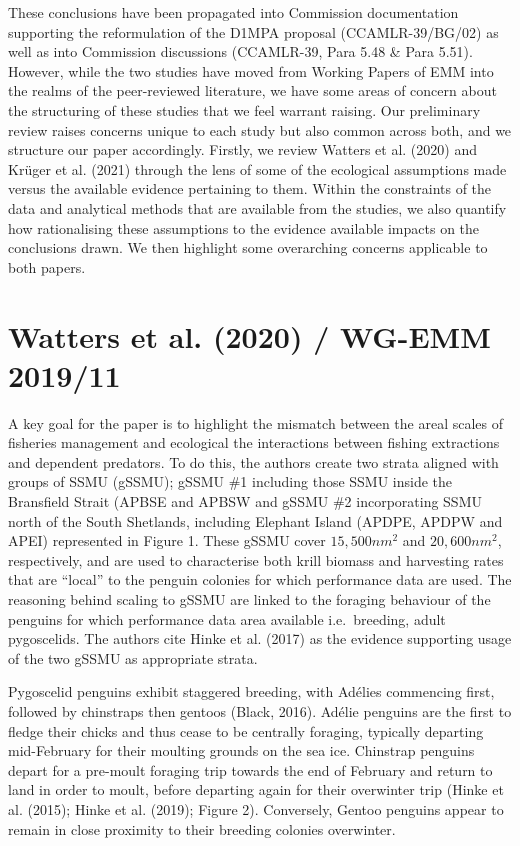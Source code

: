 \documentclass[]{elsarticle} %
\begin{document}
These conclusions have been propagated into Commission documentation
supporting the reformulation of the D1MPA proposal (CCAMLR-39/BG/02) as
well as into Commission discussions (CCAMLR-39, Para 5.48 \& Para 5.51).
However, while the two studies have moved from Working Papers of EMM
into the realms of the peer-reviewed literature, we have some areas of
concern about the structuring of these studies that we feel warrant
raising. Our preliminary review raises concerns unique to each study but
also common across both, and we structure our paper accordingly.
Firstly, we review Watters et al. (2020) and Krüger et al. (2021)
through the lens of some of the ecological assumptions made versus the
available evidence pertaining to them. Within the constraints of the
data and analytical methods that are available from the studies, we also
quantify how rationalising these assumptions to the evidence available
impacts on the conclusions drawn. We then highlight some overarching
concerns applicable to both papers.

\hypertarget{watters2020-wg-emm-201911}{%
\section{Watters et al. (2020) / WG-EMM
2019/11}\label{watters2020-wg-emm-201911}}

A key goal for the paper is to highlight the mismatch between the areal
scales of fisheries management and ecological the interactions between
fishing extractions and dependent predators. To do this, the authors
create two strata aligned with groups of SSMU (gSSMU); gSSMU \#1
including those SSMU inside the Bransfield Strait (APBSE and APBSW and
gSSMU \#2 incorporating SSMU north of the South Shetlands, including
Elephant Island (APDPE, APDPW and APEI) represented in Figure 1. These
gSSMU cover \(15,500nm^2\) and \(20,600nm^2\), respectively, and are
used to characterise both krill biomass and harvesting rates that are
``local'' to the penguin colonies for which performance data are used.
The reasoning behind scaling to gSSMU are linked to the foraging
behaviour of the penguins for which performance data area available
i.e.~breeding, adult pygoscelids. The authors cite Hinke et al. (2017)
as the evidence supporting usage of the two gSSMU as appropriate strata.

Pygoscelid penguins exhibit staggered breeding, with Adélies commencing
first, followed by chinstraps then gentoos (Black, 2016). Adélie
penguins are the first to fledge their chicks and thus cease to be
centrally foraging, typically departing mid-February for their moulting
grounds on the sea ice. Chinstrap penguins depart for a pre-moult
foraging trip towards the end of February and return to land in order to
moult, before departing again for their overwinter trip (Hinke et al.
(2015); Hinke et al. (2019); Figure 2). Conversely, Gentoo penguins
appear to remain in close proximity to their breeding colonies
overwinter.
\end{document}
